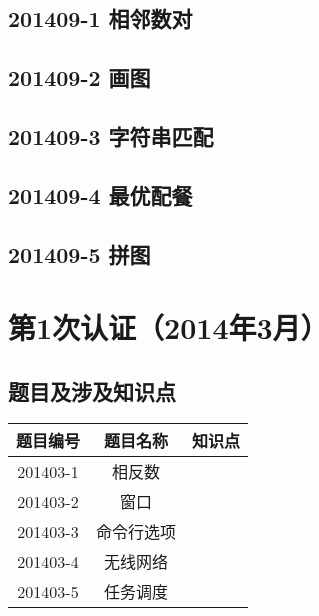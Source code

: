 \documentclass[cn,10pt,math=newtx,citestyle=gb7714-2015,bibstyle=gb7714-2015]{elegantbook}
\newif\ifonlyanalyze %
\begin{document}
\newpage
\section{201409-1 相邻数对}
\ifonlyanalyze
\else
    
\fi


\newpage
\section{201409-2 画图}
\ifonlyanalyze
\else
    
\fi


\newpage
\section{201409-3 字符串匹配}
\ifonlyanalyze
\else
    
\fi


\newpage
\section{201409-4 最优配餐}
\ifonlyanalyze
\else
    
\fi


\newpage
\section{201409-5 拼图}
\ifonlyanalyze
\else
    
\fi



\chapter{第1次认证（2014年3月）}

\section{题目及涉及知识点}

\begin{table}[htbp]
    \centering
    \begin{tabular}{ccc}
        \toprule
        题目编号 & 题目名称   & 知识点 \\
        \midrule
        201403-1 & 相反数     &        \\
        201403-2 & 窗口       &        \\
        201403-3 & 命令行选项 &        \\
        201403-4 & 无线网络   &        \\
        201403-5 & 任务调度   &        \\
        \bottomrule
    \end{tabular}
\end{table}
\end{document}
